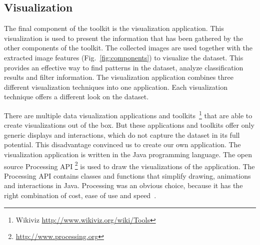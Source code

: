 %



\subsection{Visualization}
The final component of the toolkit is the visualization application.
This visualization is used to present the information that has been gathered by the other components of the toolkit.
The collected images are used together with the extracted image features (Fig.~\ref{fig:components}) to visualize the dataset.
This provides an effective way to find patterns in the dataset, analyze classification results and filter information.
The visualization application combines three different visualization techniques into one application.
Each visualization technique offers a different look on the dataset.

There are multiple data visualization applications and toolkits~\footnote{Wikiviz \url{http://www.wikiviz.org/wiki/Tools}} that are able to create visualizations out of the box.
But these applications and toolkits offer only generic displays and interactions, which do not capture the dataset in its full potential.
This disadvantage convinced us to create our own application.
The visualization application is written in the Java programming language.
The open source Processing API \footnote{\url{http://www.processing.org}} is used to draw the visualizations of the application.
The Processing API contains classes and functions that simplify drawing, animations and interactions in Java.
Processing was an obvious choice, because it has the right combination of cost, ease of use and speed~\cite{fry08}.


